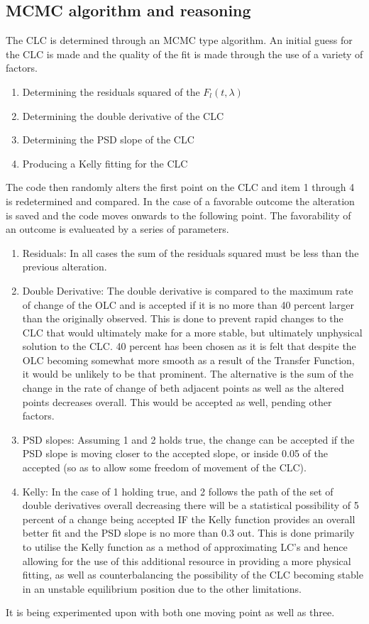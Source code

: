 \documentclass[11pt]{article}
\begin{document}
\subsection{MCMC algorithm and reasoning}
The CLC is determined through an MCMC type algorithm. An initial guess for the CLC is made and the quality of the fit is made through the use of a variety of factors. 
\begin{enumerate}
\item Determining the residuals squared of the $F_l(t,\lambda)$
\item Determining the double derivative of the CLC
\item Determining the PSD slope of the CLC
\item Producing a Kelly fitting for the CLC
\end{enumerate}
The code then randomly alters the first point on the CLC and item 1 through 4 is redetermined and compared. In the case of a favorable outcome the alteration is saved and the code moves onwards to the following point. The favorability of an outcome is evalueated by a series of parameters. 
\begin{enumerate}
\item Residuals: In all cases the sum of the residuals squared must be less than the previous alteration.
\item Double Derivative: The double derivative is compared to the maximum rate of change of the OLC and is accepted if it is no more than 40 percent larger than the originally observed. This is done to prevent rapid changes to the CLC that would ultimately make for a more stable, but ultimately unphysical solution to the CLC. 40 percent has been chosen as it is felt that despite the OLC becoming somewhat more smooth as a result of the Transfer Function, it would be unlikely to be that prominent. The alternative is the sum of the change in the rate of change of beth adjacent points as well as the altered points decreases overall. This would be accepted as well, pending other factors.
\item PSD slopes: Assuming 1 and 2 holds true, the change can be accepted if the PSD slope is moving closer to the accepted slope, or inside 0.05 of the accepted (so as to allow some freedom of movement of the CLC).
\item Kelly: In the case of 1 holding true, and 2 follows the path of the set of double derivatives overall decreasing there will be a statistical possibility of 5 percent of a change being accepted IF the Kelly function provides an overall better fit and the PSD slope is no more than 0.3 out. This is done primarily to utilise the Kelly function as a method of approximating LC's and hence allowing for the use of this additional resource in providing a more physical fitting, as well as counterbalancing the possibility of the CLC becoming stable in an unstable equilibrium position due to the other limitations.
\end{enumerate}
It is being experimented upon with both one moving point as well as three. 
\end{document}

